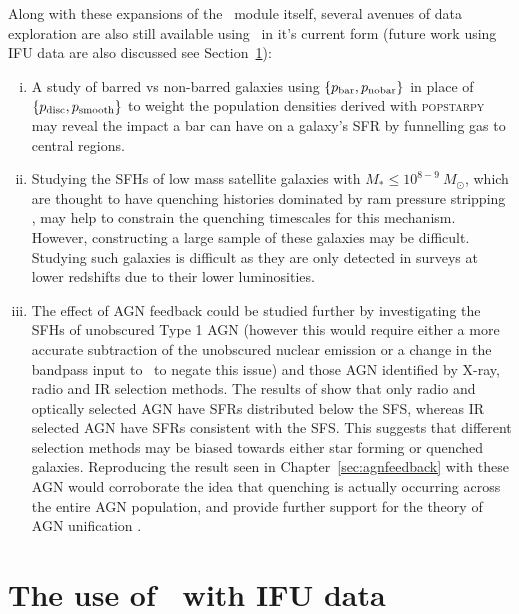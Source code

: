 Along with these expansions of the \starpy\ module itself, several avenues of data exploration are also still available using \starpy\ in it's current form (future work using IFU data are also discussed see Section~\ref{sec:IFU}):
\begin{enumerate}[(i)]

\item A study of barred vs non-barred galaxies using $\{p_{\rm{bar}}, p_{\rm{no bar}}\}$ in place of $\{p_{\rm{disc}}, p_{\rm{smooth}}\}$ to weight the population densities derived with \textsc{popstarpy} may reveal the impact a bar can have on a galaxy's SFR by funnelling gas to central regions.

\item Studying the SFHs of low mass satellite galaxies with $M_* \leq 10^{8-9} ~M_{\odot}$, which are thought to have quenching histories dominated by ram pressure stripping \citep{hester06, fillingham16}, may help to constrain the quenching timescales for this mechanism. However, constructing a large sample of these galaxies may be difficult. Studying such galaxies is difficult as they are only detected in surveys at lower redshifts due to their lower luminosities. 

\item The effect of AGN feedback could be studied further by investigating the SFHs of unobscured Type 1 AGN (however this would require either a more accurate subtraction of the unobscured nuclear emission or a change in the bandpass input to \starpy\ to negate this issue) and those AGN identified by X-ray, radio and IR selection methods.  The results of \citep{ellison16} show that only radio and optically selected AGN have SFRs distributed below the SFS, whereas IR selected AGN have SFRs consistent with the SFS. This suggests that different selection methods may be biased towards either star forming or quenched galaxies. Reproducing the result seen in Chapter~\ref{sec:agnfeedback} with these AGN would corroborate the idea that quenching is actually occurring across the entire AGN population, and provide further support for the theory of AGN unification \citep{antonucci93, urry95}.

\end{enumerate}

\section{The use of \starpy\ with IFU data}\label{sec:IFU}

